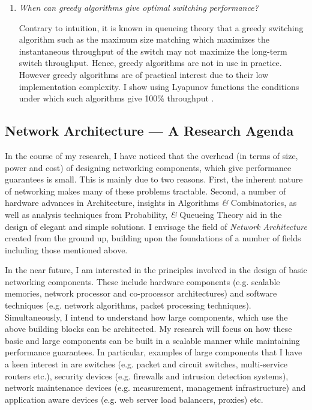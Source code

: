 \documentclass[a4paper, 10pt]{article}
\begin{document}
\begin{small}
\begin{enumerate}
\item {\em When can greedy algorithms give optimal switching performance?}

Contrary to intuition, it is known in queueing theory that a greedy
switching algorithm such as the maximum size matching which
maximizes the instantaneous throughput of the switch may not
maximize the long-term switch throughput. Hence, greedy algorithms
are not in use in practice.
However greedy algorithms are of practical interest due to their low implementation complexity.
I show using Lyapunov functions the conditions under which
such algorithms give 100\% throughput \cite{msm}.

\end{enumerate}

\subsection*{Network Architecture ---  A Research Agenda}

   In the course of my research, I have noticed that the overhead (in terms
of size, power and cost) of designing networking components, which give 
performance guarantees is small. 
This is mainly due to two reasons. First, the inherent nature of 
networking makes many of these problems tractable. Second, a number of
hardware advances in Architecture, insights in Algorithms {\it \&} Combinatorics, 
as well as analysis techniques from Probability, {\it \&} Queueing Theory 
aid in the design of elegant and simple solutions.
I envisage the field of {\it Network Architecture} created from the 
ground up, building upon the foundations of a number of fields
including those mentioned above.

In the near future, I am interested in the 
principles involved in the design of basic networking 
components. These include
hardware components (e.g. scalable memories, 
network processor and co-processor architectures) and 
software techniques (e.g. network algorithms, packet processing 
techniques). 
  Simultaneously, I intend to understand how large components, which use
the above building blocks can be architected.
My research will focus on how these basic and large
components can be built in a scalable manner while maintaining 
performance guarantees. 
In particular, examples of large components that I have a keen
interest in are switches 
(e.g. packet and circuit switches, multi-service routers etc.), 
security devices (e.g. firewalls and intrusion detection 
systems), network maintenance devices (e.g. measurement,
management infrastructure) and application aware devices
(e.g. web server load balancers, proxies) etc. 


\end{small}
\end{document}
